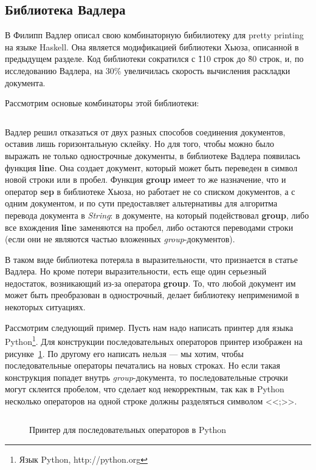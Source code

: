 \newpage

\subsection{Библиотека Вадлера}

В \cite{wadler} Филипп Вадлер описал свою комбинаторную бибилиотеку для pretty printing на языке Haskell. Она является модификацией библиотеки Хьюза, описанной в предыдущем разделе. Код библиотеки сократился с \~110 строк до \~80 строк, и, по исследованию Вадлера, на 30\% увеличилась скорость вычисления раскладки документа.

Рассмотрим основые комбинаторы этой библиотеки:
\inputminted{haskell}{codes/wadlerBasicOperations.hs}

Вадлер решил отказаться от двух разных способов соединения документов, оставив лишь горизонтальную склейку. Но для того, чтобы можно было выражать не только однострочные документы, в библиотеке Вадлера появилась функция \textbf{line}. Она создает документ, который может быть переведен в символ новой строки или в пробел.
Функция \textbf{group} имеет то же назначение, что и оператор \textbf{sep} в библиотеке Хьюза, но работает не со списком документов, а с одним документом, и по сути предоставляет альтернативы для алгоритма перевода документа в \textit{String}: в документе, на который подействовал \textbf{group}, либо все вхождения \textbf{line} заменяются на пробел, либо остаются переводами строки (если они не являются частью вложенных \textit{group}-документов).

В таком виде библиотека потеряла в выразительности, что признается в статье Вадлера. Но кроме потери выразительности, есть еще один серьезный недостаток, возникающий из-за оператора \textbf{group}. То, что любой документ им может быть преобразован в однострочный, делает библиотеку неприменимой в некоторых ситуациях. 

Рассмотрим следующий пример. Пусть нам надо написать принтер для языка Python\footnote{Язык Python, http://python.org}. Для конструкции последовательных операторов принтер изображен на рисунке~\ref{fig:pythonPrinter}.
По другому его написать нельзя --- мы хотим, чтобы последовательные операторы печатались на новых строках. Но если такая конструкция попадет внутрь \textit{group}-документа, то последовательные строчки могут склеится пробелом, что сделает код некорректным, так как в Python несколько операторов на одной строке должны разделяться символом <<;>>.

\begin{figure}[h!]
	\inputminted{haskell}{codes/pythonPrinter.hs}
	\caption{Принтер для последовательных операторов в Python}
	\label{fig:pythonPrinter}
\end{figure}

